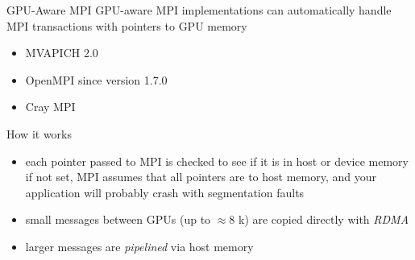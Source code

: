 \begin{frame}[fragile]{}
    \begin{info}{GPU-Aware MPI}
        GPU-aware MPI implementations can automatically handle MPI transactions with pointers to GPU memory
        \begin{itemize}
            \item MVAPICH 2.0
            \item OpenMPI since version 1.7.0
            \item Cray MPI
        \end{itemize}
    \end{info}

    \begin{info}{How it works}
        \begin{itemize}
            \item each pointer passed to MPI is checked to see if it is in host or device memory
            if not set, MPI assumes that all pointers are to host memory, and your application will probably crash with segmentation faults\item small messages between GPUs (up to $\approx$8 k) are copied directly with \emph{RDMA}
            \item larger messages are \emph{pipelined} via host memory
        \end{itemize}
    \end{info}

\end{frame}


